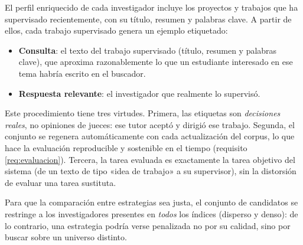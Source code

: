 El perfil enriquecido de cada investigador incluye los proyectos y trabajos que ha supervisado recientemente, con su título, resumen y palabras clave.
A partir de ellos, cada trabajo supervisado genera un ejemplo etiquetado:

\begin{itemize}
    \item \textbf{Consulta}: el texto del trabajo supervisado (título, resumen y palabras clave), que aproxima razonablemente lo que un estudiante interesado en ese tema habría escrito en el buscador.
    \item \textbf{Respuesta relevante}: el investigador que realmente lo supervisó.
\end{itemize}

Este procedimiento tiene tres virtudes.
Primera, las etiquetas son \emph{decisiones reales}, no opiniones de jueces: ese tutor aceptó y dirigió ese trabajo.
Segunda, el conjunto se regenera automáticamente con cada actualización del corpus, lo que hace la evaluación reproducible y sostenible en el tiempo (requisito \ref{req:evaluacion}).
Tercera, la tarea evaluada es exactamente la tarea objetivo del sistema (de un texto de tipo «idea de trabajo» a su supervisor), sin la distorsión de evaluar una tarea sustituta.

Para que la comparación entre estrategias sea justa, el conjunto de candidatos se restringe a los investigadores presentes en \emph{todos} los índices (disperso y denso): de lo contrario, una estrategia podría verse penalizada no por su calidad, sino por buscar sobre un universo distinto.

